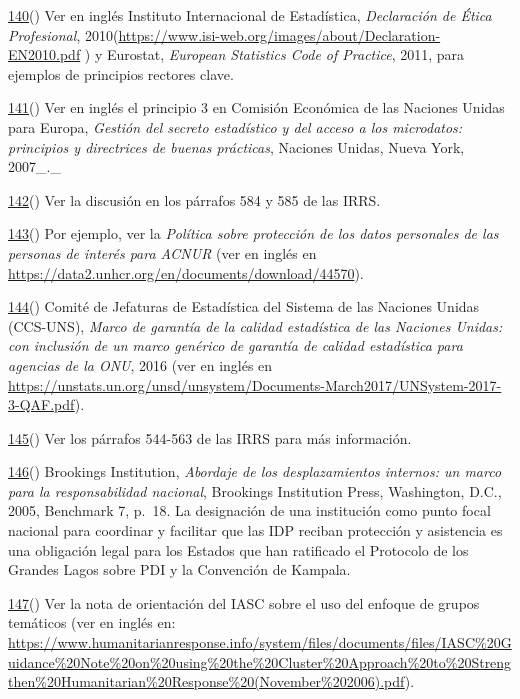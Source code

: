 \documentclass[
]{book}
\begin{document}
\protect\hyperlink{sdfootnote140anc}{140}() Ver en inglés Instituto Internacional de Estadística, \emph{Declaración de Ética Profesional}, 2010(\url{https://www.isi-web.org/images/about/Declaration-EN2010.pdf} ) y Eurostat, \emph{European Statistics Code of Practice}, 2011, para ejemplos de principios rectores clave.

\protect\hyperlink{sdfootnote141anc}{141}() Ver en inglés el principio 3 en Comisión Económica de las Naciones Unidas para Europa, \emph{Gestión del secreto estadístico y del acceso a los microdatos: principios y directrices de buenas prácticas}, Naciones Unidas, Nueva York, 2007\_.\_

\protect\hyperlink{sdfootnote142anc}{142}() Ver la discusión en los párrafos 584 y 585 de las IRRS.

\protect\hyperlink{sdfootnote143anc}{143}() Por ejemplo, ver la \emph{Política sobre protección de los datos personales de las personas de interés para ACNUR} (ver en inglés en \url{https://data2.unhcr.org/en/documents/download/44570}).

\protect\hyperlink{sdfootnote144anc}{144}() Comité de Jefaturas de Estadística del Sistema de las Naciones Unidas (CCS-UNS), \emph{Marco de garantía de la calidad estadística de las Naciones Unidas: con inclusión de un marco genérico de garantía de calidad estadística para agencias de la ONU}, 2016 (ver en inglés en \url{https://unstats.un.org/unsd/unsystem/Documents-March2017/UNSystem-2017-3-QAF.pdf}).

\protect\hyperlink{sdfootnote145anc}{145}() Ver los párrafos 544-563 de las IRRS para más información.

\protect\hyperlink{sdfootnote146anc}{146}() Brookings Institution, \emph{Abordaje de los desplazamientos internos: un marco para la responsabilidad nacional}, Brookings Institution Press, Washington, D.C., 2005, Benchmark 7, p.~18. La designación de una institución como punto focal nacional para coordinar y facilitar que las IDP reciban protección y asistencia es una obligación legal para los Estados que han ratificado el Protocolo de los Grandes Lagos sobre PDI y la Convención de Kampala.

\protect\hyperlink{sdfootnote147anc}{147}() Ver la nota de orientación del IASC sobre el uso del enfoque de grupos temáticos (ver en inglés en: \url{https://www.humanitarianresponse.info/system/files/documents/files/IASC\%20Guidance\%20Note\%20on\%20using\%20the\%20Cluster\%20Approach\%20to\%20Strengthen\%20Humanitarian\%20Response\%20(November\%202006).pdf}).
\end{document}
